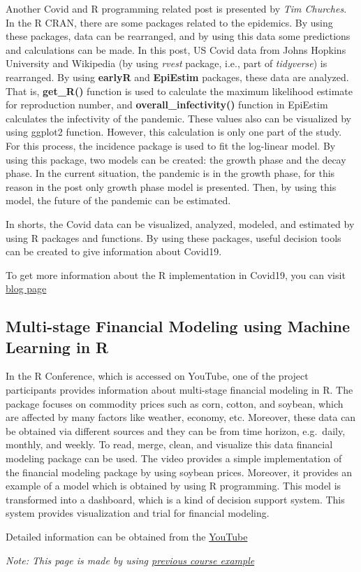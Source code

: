 \documentclass[
]{article}
\begin{document}
Another Covid and R programming related post is presented by \emph{Tim
Churches}. In the R CRAN, there are some packages related to the
epidemics. By using these packages, data can be rearranged, and by using
this data some predictions and calculations can be made. In this post,
US Covid data from Johns Hopkins University and Wikipedia (by using
\emph{rvest} package, i.e., part of \emph{tidyverse}) is rearranged. By
using \textbf{earlyR} and \textbf{EpiEstim} packages, these data are
analyzed. That is, \textbf{get\_R()} function is used to calculate the
maximum likelihood estimate for reproduction number, and
\textbf{overall\_infectivity()} function in EpiEstim calculates the
infectivity of the pandemic. These values also can be visualized by
using ggplot2 function. However, this calculation is only one part of
the study. For this process, the incidence package is used to fit the
log-linear model. By using this package, two models can be created: the
growth phase and the decay phase. In the current situation, the pandemic
is in the growth phase, for this reason in the post only growth phase
model is presented. Then, by using this model, the future of the
pandemic can be estimated.

In shorts, the Covid data can be visualized, analyzed, modeled, and
estimated by using R packages and functions. By using these packages,
useful decision tools can be created to give information about Covid19.

To get more information about the R implementation in Covid19, you can
visit
\href{https://rviews.rstudio.com/2020/03/05/covid-19-epidemiology-with-r/}{blog
page}

\hypertarget{multi-stage-financial-modeling-using-machine-learning-in-r-1}{%
\subsection{Multi-stage Financial Modeling using Machine Learning in
R}\label{multi-stage-financial-modeling-using-machine-learning-in-r-1}}

In the R Conference, which is accessed on YouTube, one of the project
participants provides information about multi-stage financial modeling
in R. The package focuses on commodity prices such as corn, cotton, and
soybean, which are affected by many factors like weather, economy, etc.
Moreover, these data can be obtained via different sources and they can
be from time horizon, e.g.~daily, monthly, and weekly. To read, merge,
clean, and visualize this data financial modeling package can be used.
The video provides a simple implementation of the financial modeling
package by using soybean prices. Moreover, it provides an example of a
model which is obtained by using R programming. This model is
transformed into a dashboard, which is a kind of decision support
system. This system provides visualization and trial for financial
modeling.

Detailed information can be obtained from the
\href{https://www.youtube.com/watch?v=-cgwDHzd0p4}{YouTube}

\emph{Note: This page is made by using
\href{https://pjournal.github.io/boun01-EbruGecici/}{previous course
example}}
\end{document}
